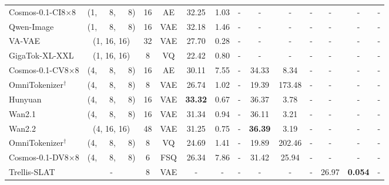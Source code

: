 \begin{table}[t]
{\begin{tabular}{l ccc ccc ccc ccc}
        \quad Cosmos-0.1-CI8$\times$8  & (1,~~~8,~~~8)   & 16 & AE  & 32.25          & 1.03         & -      & -     & -     & -      & -     & -     & - \\
        \quad Qwen-Image & (1,~~~8,~~~8) & 16 & VAE & 32.18 & 1.46 & -      & -     & -     & -      & -     & -     & - \\
        \quad VA-VAE         & (1, 16, 16) & 32 & VAE & 27.70          & 0.28         & -      & -     & -     & -      & -     & -     & - \\
        \rowcolor{gray!15} \quad GigaTok-XL-XXL & (1, 16, 16) & 8 & VQ & 22.42 & 0.80 & -      & -     & -     & -      & -     & -     & - \\
        \quad Cosmos-0.1-CV8$\times$8  & (4,~~~8,~~~8) & 16 & AE  & 30.11             & 7.55             & -      & 34.33 & 8.34 & -      & -     & -     & - \\
        \quad OmniTokenizer$^\dagger$      & (4,~~~8,~~~8)   & 8 & VAE  & 26.74          & 1.02         & -      & 19.39  & 173.48  & -      & -     & -     & - \\
        \quad Hunyuan         & (4,~~~8,~~~8)   & 16 & VAE & \textbf{33.32}          & 0.67  & -      & 36.37 & 3.78 & -      & -     & -     & - \\
        \quad Wan2.1            & (4,~~~8,~~~8)   & 16 & VAE & 31.34          & 0.94         & -      & 36.11  & 3.21  & -      & -     & -     & - \\
        \quad Wan2.2          & (4, 16, 16)   & 48 & VAE & 31.25    & 0.75       & - & \textbf{36.39} & 3.19 & -      & -     & -     & - \\
        \rowcolor{gray!15} \quad OmniTokenizer$^\dagger$      & (4,~~~8,~~~8)   & 8 & VQ  & 24.69          & 1.41         & -      & 19.89    & 202.46     & -      & -     & -     & - \\
        \rowcolor{gray!15} \quad Cosmos-0.1-DV8$\times$8  & (4,~~~8,~~~8) & 6 & FSQ  & 26.34             & 7.86             & -      & 31.42 & 25.94 & -      & -     & -     & - \\
        \quad Trellis-SLAT   & -           & 8  & VAE & -             & -             & -      & -     & -     & -      & 26.97 & \textbf{0.054} & - \\


\end{tabular}}
\end{table}
